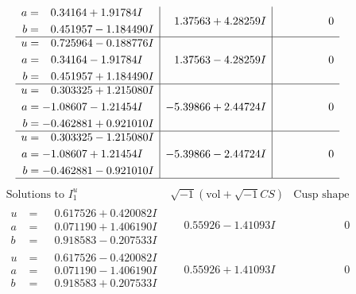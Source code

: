 \documentclass[1p]{elsarticle_modified}
\theoremstyle{definition}
\newcommand{\I}{\sqrt{-1}}
\begin{document}
$$\begin{array}{c|c|c}
\begin{aligned}
a &= \phantom{-}0.34164 + 1.91784 I \\
b &= \phantom{-}0.451957 - 1.184490 I\end{aligned}
 & \phantom{-}1.37563 + 4.28259 I & \phantom{-0.000000 } 0 \\ \hline\begin{aligned}
u &= \phantom{-}0.725964 - 0.188776 I \\
a &= \phantom{-}0.34164 - 1.91784 I \\
b &= \phantom{-}0.451957 + 1.184490 I\end{aligned}
 & \phantom{-}1.37563 - 4.28259 I & \phantom{-0.000000 } 0 \\ \hline\begin{aligned}
u &= \phantom{-}0.303325 + 1.215080 I \\
a &= -1.08607 - 1.21454 I \\
b &= -0.462881 + 0.921010 I\end{aligned}
 & -5.39866 + 2.44724 I & \phantom{-0.000000 } 0 \\ \hline\begin{aligned}
u &= \phantom{-}0.303325 - 1.215080 I \\
a &= -1.08607 + 1.21454 I \\
b &= -0.462881 - 0.921010 I\end{aligned}
 & -5.39866 - 2.44724 I & \phantom{-0.000000 } 0\\
 \hline 
 \end{array}$$\newpage$$\begin{array}{c|c|c}  
\text{Solutions to }I^u_{1}& \I (\text{vol} + \sqrt{-1}CS) & \text{Cusp shape}\\
 \hline 
\begin{aligned}
u &= \phantom{-}0.617526 + 0.420082 I \\
a &= \phantom{-}0.071190 + 1.406190 I \\
b &= \phantom{-}0.918583 - 0.207533 I\end{aligned}
 & \phantom{-}0.55926 - 1.41093 I & \phantom{-0.000000 } 0 \\ \hline\begin{aligned}
u &= \phantom{-}0.617526 - 0.420082 I \\
a &= \phantom{-}0.071190 - 1.406190 I \\
b &= \phantom{-}0.918583 + 0.207533 I\end{aligned}
 & \phantom{-}0.55926 + 1.41093 I & \phantom{-0.000000 } 0 \\ \hline\begin{aligned}

\end{aligned}
\end{array}$$
\end{document}
